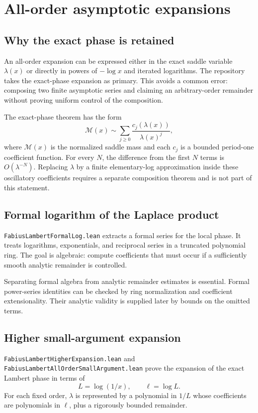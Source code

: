 \documentclass[11pt,oneside]{article}
\theoremstyle{definition}
\theoremstyle{remark}
\begin{document}
\section{All-order asymptotic expansions}\label{ch:all-orders}

\subsection{Why the exact phase is retained}
An all-order expansion can be expressed either in the exact saddle variable \(\lambda(x)\) or directly in powers of \(-\log x\) and iterated logarithms.  The repository takes the exact-phase expansion as primary.  This avoids a common error: composing two finite asymptotic series and claiming an arbitrary-order remainder without proving uniform control of the composition.

The exact-phase theorem has the form
\[
  \mathcal M(x)
   \sim \sum_{j\geq0}\frac{c_j(\lambda(x))}{\lambda(x)^j},
\]
where \(\mathcal M(x)\) is the normalized saddle mass and each \(c_j\) is a bounded period-one coefficient function.  For every \(N\), the difference from the first \(N\) terms is \(O(\lambda^{-N})\).  Replacing \(\lambda\) by a finite elementary-log approximation inside these oscillatory coefficients requires a separate composition theorem and is not part of this statement.

\subsection{Formal logarithm of the Laplace product}
\nolinkurl{FabiusLambertFormalLog.lean} extracts a formal series for the local phase.  It treats logarithms, exponentials, and reciprocal series in a truncated polynomial ring.  The goal is algebraic: compute coefficients that must occur if a sufficiently smooth analytic remainder is controlled.

Separating formal algebra from analytic remainder estimates is essential.  Formal power-series identities can be checked by ring normalization and coefficient extensionality.  Their analytic validity is supplied later by bounds on the omitted terms.

\subsection{Higher small-argument expansion}
\nolinkurl{FabiusLambertHigherExpansion.lean} and \nolinkurl{FabiusLambertAllOrderSmallArgument.lean} prove the expansion of the exact Lambert phase in terms of
\[
  L=\log(1/x),
  \qquad
  \ell=\log L.
\]
For each fixed order, \(\lambda\) is represented by a polynomial in \(1/L\) whose coefficients are polynomials in \(\ell\), plus a rigorously bounded remainder.
\end{document}
